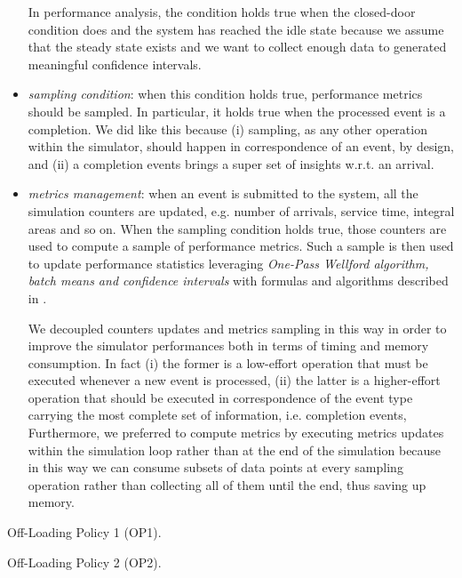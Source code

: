 \begin{itemize}
	In performance analysis, the condition holds true when the closed-door condition does and the system has reached the idle state because we assume that the steady state exists and we want to collect enough data to generated meaningful confidence intervals.
	
	\item \textit{sampling condition}: when this condition holds true, performance metrics should be sampled. 
	In particular, it holds true when the processed event is a completion. 
	We did like this because 
	(i) sampling, as any other operation within the simulator, should happen in correspondence of an event, by design, and
	(ii) a completion events brings a super set of insights w.r.t. an arrival.
	
	
	\item \textit{metrics management}: when an event is submitted to the system, all the simulation counters are updated, e.g. number of arrivals, service time, integral areas and so on. 
	When the sampling condition holds true, those counters are used to compute a sample of performance metrics. Such a sample is then used to update performance statistics leveraging \textit{One-Pass Wellford algorithm, batch means and confidence intervals} with formulas and algorithms described in \cite{leemis2006discrete}.
	
	We decoupled counters updates and metrics sampling in this way in order to improve the simulator performances both in terms of timing and memory consumption.
	In fact
	(i) the former is a low-effort operation that must be executed whenever a new event is processed,
	(ii) the latter is a higher-effort operation that should be executed in correspondence of the event type carrying the most complete set of information, i.e. completion events,
	Furthermore, we preferred to compute metrics by executing metrics updates within the simulation loop rather than at the end of the simulation because in this way we can consume subsets of data points at every sampling operation rather than collecting all of them until the end, thus saving up memory.
\end{itemize}

\begin{algorithm}
	\SetAlgoLined
	\caption{Off-Loading Policy 1 (OP1).}
	\label{alg:off-loading-policy-1}
\end{algorithm}

\begin{algorithm}
	\SetAlgoLined
	\caption{Off-Loading Policy 2 (OP2).}
	\label{alg:off-loading-policy-2}
\end{algorithm}

